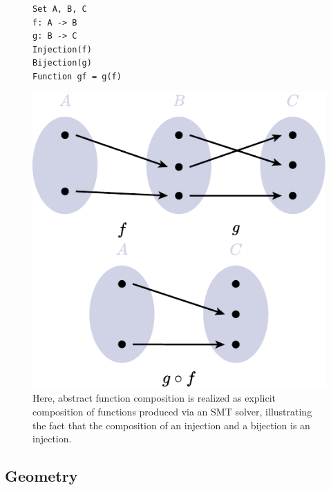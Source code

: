 \begin{figure}
   \centering
   \begin{minipage}{160pt}
      \begin{mdframed}[style=SUBCode]
         \begin{lstlisting}[language=Sub-ST,escapechar=@,numbers=none]
Set A, B, C
f: A -> B
g: B -> C
Injection(f)
Bijection(g)
Function gf = g(f)\end{lstlisting}
      \end{mdframed}
   \end{minipage}\hfill
   \begin{minipage}[c]{240pt}
      \includegraphics[width=.8\linewidth]{assets/penrose/FunctionComposition.pdf}
   \end{minipage}
   \caption{Here, abstract function composition is realized as explicit composition of functions produced via an SMT solver, illustrating the fact that the composition of an injection and a bijection is an injection. \label{fig:FunctionComposition}}\vspace{-\baselineskip}
\end{figure}

\subsection{Geometry}
\label{sec:Geometry}


